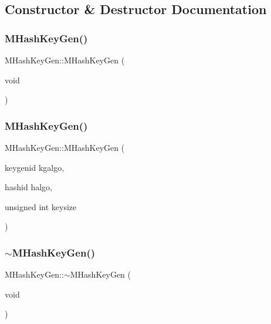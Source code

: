 \subsection{Constructor \& Destructor Documentation}
\mbox{\label{classMHashKeyGen_a1cffb83fdf21b8300eac6e162a40dfee}} 
\subsubsection{M\+Hash\+Key\+Gen()\hspace{0.1cm}{\footnotesize\ttfamily [1/2]}}
{\footnotesize\ttfamily M\+Hash\+Key\+Gen\+::\+M\+Hash\+Key\+Gen (\begin{DoxyParamCaption}\item[{void}]{ }\end{DoxyParamCaption})}

\mbox{\label{classMHashKeyGen_ae871e6bdee1a294aa6afa0730fd0d1aa}} 
\subsubsection{M\+Hash\+Key\+Gen()\hspace{0.1cm}{\footnotesize\ttfamily [2/2]}}
{\footnotesize\ttfamily M\+Hash\+Key\+Gen\+::\+M\+Hash\+Key\+Gen (\begin{DoxyParamCaption}\item[{keygenid}]{kgalgo,  }\item[{hashid}]{halgo,  }\item[{unsigned int}]{keysize }\end{DoxyParamCaption})}

\mbox{\label{classMHashKeyGen_ac84419b92def320f8c7f3fdd6a82838c}} 
\subsubsection{$\sim$\+M\+Hash\+Key\+Gen()}
{\footnotesize\ttfamily M\+Hash\+Key\+Gen\+::$\sim$\+M\+Hash\+Key\+Gen (\begin{DoxyParamCaption}\item[{void}]{ }\end{DoxyParamCaption})}



